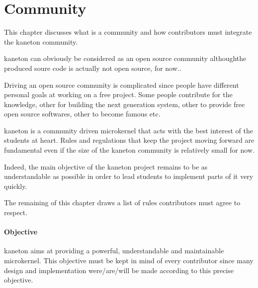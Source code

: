 %
%
%
%
%
%

%
%

\chapter{Community}

This chapter discusses what is a community and how contributors must integrate
the kaneton community.

\newpage

%
%

kaneton can obviously be considered as an open source community althoughthe
produced soure code is actually not open source, for now..

Driving an open source community is complicated since people have different
personal goals at working on a free project. Some people contribute for
the knowledge, other for building the next generation system, other to
provide free open source softwares, other to become famous etc.

kaneton is a community driven microkernel that acts with the best interest of
the students at heart. Rules and regulations that keep the project moving
forward are fundamental even if the size of the kaneton community is
relatively small for now.

Indeed, the main objective of the kaneton project remains to be as
understandable as possible in order to lead students to implement parts of
it very quickly.

The remaining of this chapter draws a list of rules contributors must agree
to respect.


\subsubsection{Objective}

kaneton aims at providing a powerful, understandable and maintainable
microkernel. This objective must be kept in mind of every contributor
since many design and implementation were/are/will be made according to
this precise objective.


